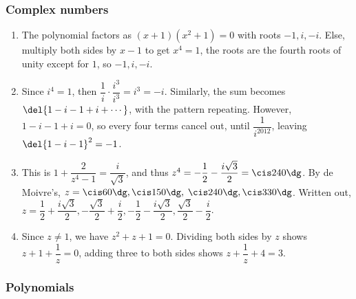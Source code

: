 \documentclass[10pt,paper=letter]{scrartcl}
\begin{document}
\subsubsection*{Complex numbers}

\begin{enumerate}

\item The polynomial factors as $(x+1)(x^2+1) = 0$ with roots $-1, i, -i$. Else, multiply both sides by $x-1$ to get $x^4 = 1$, the roots are the fourth roots of unity except for $1$, so $-1, i, -i$.

\item Since $i^4 = 1$, then $\dfrac1i \cdot \dfrac{i^3}{i^3} = i^3 = -i$. Similarly, the sum becomes $\del{1 - i - 1 + i + \cdots}$, with the pattern repeating. However, $1 - i - 1 + i = 0$, so every four terms cancel out, until $\dfrac1{i^{2012}}$, leaving $\del{1 - i - 1}^2 = -1$.

\item This is $1 + \dfrac2{z^4 - 1} = \dfrac i{\sqrt3}$, and thus $z^4 = -\dfrac12 - \dfrac {i\sqrt3}2 = \cis240\dg$. By de Moivre's, $z = \cis60\dg, \cis150\dg,$ $\cis240\dg, \cis330\dg$. Written out, $z = \dfrac12 + \dfrac{i\sqrt3}2, - \dfrac{\sqrt3}2 + \dfrac i2, - \dfrac12 - \dfrac{i\sqrt3}2, \dfrac{\sqrt3}2 - \dfrac i2$.

\item Since $z \neq 1$, we have $z^2 + z + 1 = 0$. Dividing both sides by $z$ shows $z + 1 + \dfrac1z = 0$, adding three to both sides shows $z + \dfrac1z + 4 = 3$.

\end{enumerate}

\subsubsection*{Polynomials}
\end{document}
